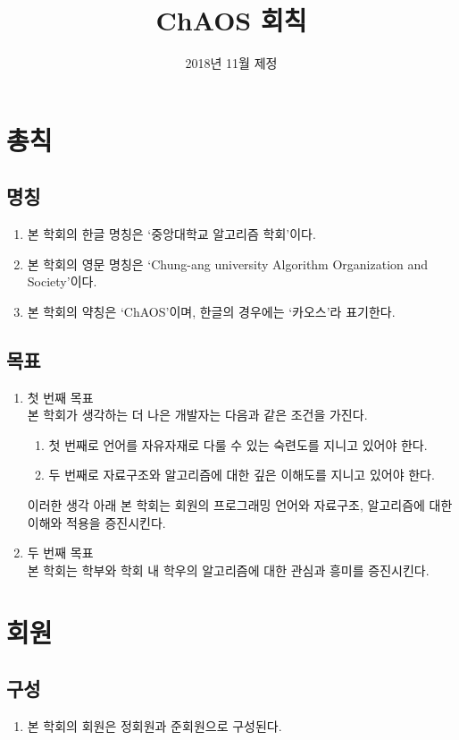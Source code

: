 \documentclass{oblivoir}
\title{ChAOS 회칙}
\date{2018년 11월 제정}
\begin{document}
\maketitle

\chapter{총칙}

\section{명칭}
\begin{enumerate}
    \item 본 학회의 한글 명칭은 `중앙대학교 알고리즘 학회'이다.
    \item 본 학회의 영문 명칭은 `Chung-ang university Algorithm Organization and Society'이다.
    \item 본 학회의 약칭은 `ChAOS'이며, 한글의 경우에는 `카오스'라 표기한다.
\end{enumerate}

\section{목표}
\begin{enumerate}
    \item 첫 번째 목표 \\ 본 학회가 생각하는 더 나은 개발자는 다음과 같은 조건을 가진다.
          \begin{enumerate}
              \item 첫 번째로 언어를 자유자재로 다룰 수 있는 숙련도를 지니고 있어야 한다.
              \item 두 번째로 자료구조와 알고리즘에 대한 깊은 이해도를 지니고 있어야 한다.
          \end{enumerate}
          이러한 생각 아래 본 학회는 회원의 프로그래밍 언어와 자료구조, 알고리즘에 대한 이해와 적용을 증진시킨다.
    \item 두 번째 목표 \\ 본 학회는 학부와 학회 내 학우의 알고리즘에 대한 관심과 흥미를 증진시킨다.
\end{enumerate}

\chapter{회원}
\label{회원 장}

\section{구성}
\begin{enumerate}
    \item 본 학회의 회원은 정회원과 준회원으로 구성된다.
\end{enumerate}
\end{document}
